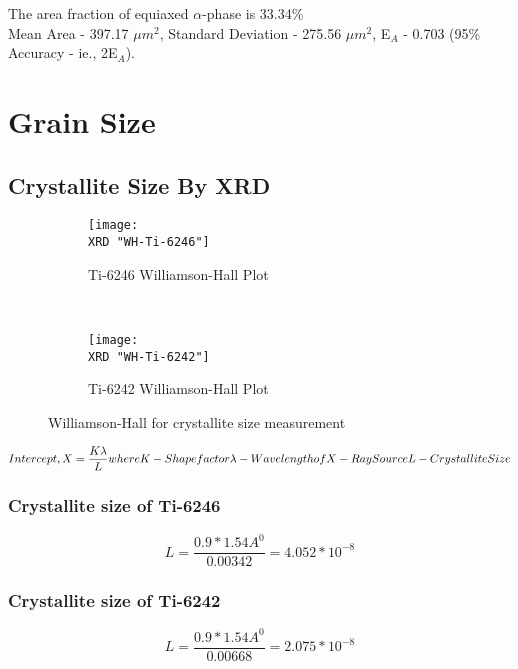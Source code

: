 The area fraction of equiaxed $\alpha$-phase is 33.34\% \\
Mean Area - 397.17 $\mu m^{2}$, Standard Deviation - 275.56 $\mu m^{2}$, E$_{A}$ - 0.703 (95\% Accuracy - ie., 2E$_{A}$).

\iffalse

\section{Grain Size}
\subsection{Crystallite Size By XRD}

\begin{figure}[H]
    \centering
    \begin{subfigure}{0.49\textwidth}
        \texttt{[image: \\XRD "WH-Ti-6246"]}
        \caption{Ti-6246 Williamson-Hall Plot}
        \label{fig:Ti-6246 Williamson-Hall Plot}
    \end{subfigure}
    ~
    \begin{subfigure}{0.49\textwidth}
        \texttt{[image: \\XRD "WH-Ti-6242"]}
        \caption{Ti-6242 Williamson-Hall Plot}
        \label{fig:Ti-6242 Williamson-Hall Plot}
    \end{subfigure}
  
    \caption{Williamson-Hall for crystallite size measurement}
    \label{fig:As-Received}
\end{figure}

\begin{equation}
Intercept, X = \frac{K \lambda}{L} \\
where \\
K - Shape factor \\
\lambda - Wavelength of X-Ray Source \\
L - Crystallite Size
\end{equation}

\subsubsection{Crystallite size of Ti-6246}
\begin{equation}
L = \frac{0.9*1.54 A^{0}}{0.00342} = 4.052 * 10^{-8}
\end{equation}

\subsubsection{Crystallite size of Ti-6242}
\begin{equation}
L = \frac{0.9*1.54 A^{0}}{0.00668} = 2.075 * 10^{-8}
\end{equation}

